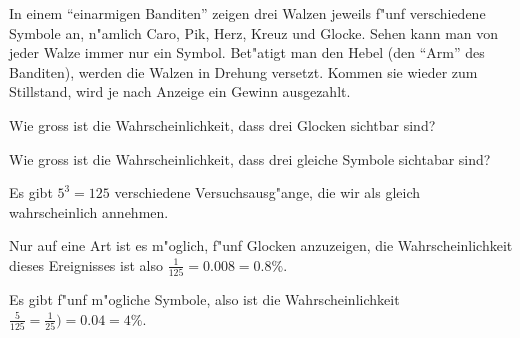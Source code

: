 In einem ``einarmigen Banditen'' zeigen drei Walzen jeweils f"unf
verschiedene Symbole an, n"amlich Caro, Pik, Herz, Kreuz und Glocke.
Sehen kann man von jeder Walze immer nur ein Symbol.
Bet"atigt man den Hebel (den ``Arm'' des Banditen),
werden die Walzen in Drehung versetzt. Kommen sie wieder zum Stillstand,
wird je nach Anzeige ein Gewinn ausgezahlt.
\begin{teilaufgaben}
\item
Wie gross ist die Wahrscheinlichkeit, dass drei Glocken sichtbar sind?
\item
Wie gross ist die Wahrscheinlichkeit, dass drei gleiche Symbole
sichtabar sind?
\end{teilaufgaben}

\begin{loesung}
Es gibt $5^3=125$ verschiedene Versuchsausg"ange, die wir als gleich
wahrscheinlich annehmen.
\begin{teilaufgaben}
\item Nur auf eine Art ist es m"oglich, f"unf Glocken anzuzeigen, die
Wahrscheinlichkeit dieses Ereignisses ist also $\frac1{125}=0.008=0.8\%$.
\item Es gibt f"unf m"ogliche Symbole, also ist die Wahrscheinlichkeit
$\frac{5}{125}=\frac1{25})=0.04=4\%$.
\end{teilaufgaben}
\end{loesung}

